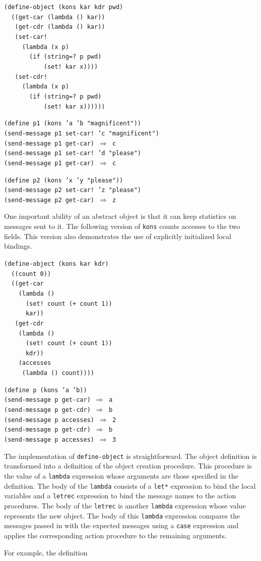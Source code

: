 \begin{alltt}
(define-object (kons kar kdr pwd)
  ((get-car (lambda () kar))
   (get-cdr (lambda () kar))
   (set-car!
     (lambda (x p)
       (if (string=? p pwd)
           (set! kar x))))
   (set-cdr!
     (lambda (x p)
       (if (string=? p pwd)
           (set! kar x))))))

(define p1 (kons 'a 'b "magnificent"))
(send-message p1 set-car! 'c "magnificent")
(send-message p1 get-car) \(\Rightarrow\) c
(send-message p1 set-car! 'd "please")
(send-message p1 get-car) \(\Rightarrow\) c

(define p2 (kons 'x 'y "please"))
(send-message p2 set-car! 'z "please")
(send-message p2 get-car) \(\Rightarrow\) z
\end{alltt}


One important ability of an abstract object is that it can keep
statistics on messages sent to it.
The following version of \texttt{kons} counts accesses to the two fields.
This version also demonstrates the use of explicitly initialized local
bindings.


\begin{alltt}
(define-object (kons kar kdr)
  ((count 0))
  ((get-car
    (lambda ()
      (set! count (+ count 1))
      kar))
   (get-cdr
    (lambda ()
      (set! count (+ count 1))
      kdr))
    (accesses
     (lambda () count))))

(define p (kons 'a 'b))
(send-message p get-car) \(\Rightarrow\) a
(send-message p get-cdr) \(\Rightarrow\) b
(send-message p accesses) \(\Rightarrow\) 2
(send-message p get-cdr) \(\Rightarrow\) b
(send-message p accesses) \(\Rightarrow\) 3
\end{alltt}


The implementation of \texttt{define-object} is straightforward.
The object definition is transformed into a definition of the object
creation procedure.
This procedure is the value of a \texttt{lambda} expression
whose arguments are those specified in the definition.
The body of the \texttt{lambda} consists of a \texttt{let*} expression
to bind the local variables and a \texttt{letrec} expression to bind
the message names to the action procedures.
The body of the \texttt{letrec} is another \texttt{lambda} expression whose
value represents the new object.
The body of this \texttt{lambda} expression compares the messages passed
in with the expected messages using a \texttt{case} expression and applies
the corresponding action procedure to the remaining arguments.


For example, the definition


